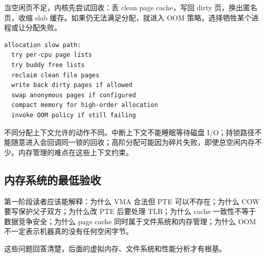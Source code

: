 当空闲页不足，内核先尝试回收：丢 clean page cache，写回 dirty 页，换出匿名页，收缩 slab 缓存。如果仍无法满足分配，就进入 OOM 策略，选择牺牲某个进程或让分配失败。

\begin{lstlisting}
allocation slow path:
  try per-cpu page lists
  try buddy free lists
  reclaim clean file pages
  write back dirty pages if allowed
  swap anonymous pages if configured
  compact memory for high-order allocation
  invoke OOM policy if still failing
\end{lstlisting}

不同分配上下文允许的动作不同。中断上下文不能睡眠等待磁盘 I/O；持锁路径不能随意进入会回调同一锁的回收；高阶分配可能因为碎片失败，即使总空闲内存不少。内存管理的难点在这些上下文约束。

\subsection{内存系统的最低验收}

第一阶段读者应该能解释：为什么 VMA 合法但 PTE 可以不存在；为什么 COW 要写保护父子双方；为什么改 PTE 后要处理 TLB；为什么 cache 一致性不等于数据竞争安全；为什么 page cache 同时属于文件系统和内存管理；为什么 OOM 不一定表示机器真的没有任何空闲字节。

这些问题回答清楚，后面的虚拟内存、文件系统和性能分析才有根基。
